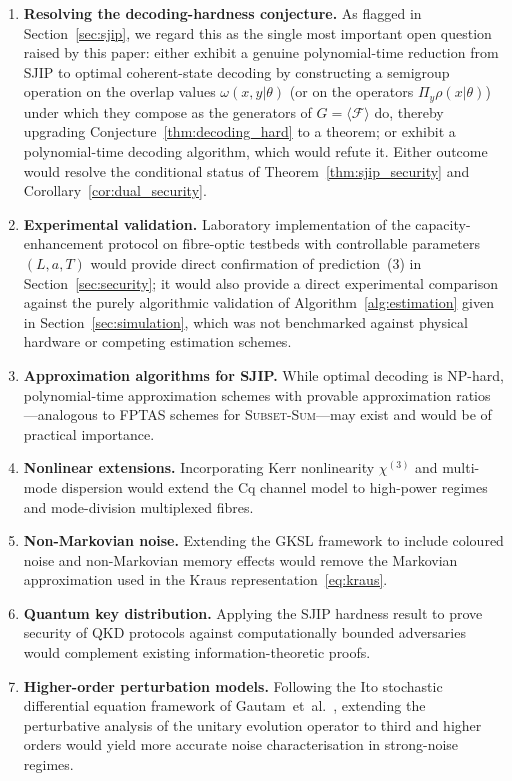 \documentclass[journal,twocolumn]{IEEEtran}
\theoremstyle{definition}
\theoremstyle{plain}
\begin{document}
\begin{enumerate}[leftmargin=*, label=(\arabic*), itemsep=2pt]
  \item \textbf{Resolving the decoding-hardness conjecture.}  As
    flagged in Section~\ref{sec:sjip}, we regard this as the single
    most important open question raised by this paper: either
    exhibit a genuine polynomial-time reduction from SJIP to optimal
    coherent-state decoding by constructing a semigroup operation on
    the overlap values $\omega(x,y|\theta)$ (or on the operators
    $\Pi_y\rho(x|\theta)$) under which they compose as the generators
    of $G=\langle\mathcal F\rangle$ do, thereby upgrading
    Conjecture~\ref{thm:decoding_hard} to a theorem; or exhibit a
    polynomial-time decoding algorithm, which would refute it.
    Either outcome would resolve the conditional status of
    Theorem~\ref{thm:sjip_security} and
    Corollary~\ref{cor:dual_security}.

  \item \textbf{Experimental validation.}  Laboratory implementation
    of the capacity-enhancement protocol on fibre-optic testbeds
    with controllable parameters $(L, a, T)$ would provide direct
    confirmation of prediction~(3) in Section~\ref{sec:security}; it
    would also provide a direct experimental comparison against the
    purely algorithmic validation of Algorithm~\ref{alg:estimation}
    given in Section~\ref{sec:simulation}, which was not benchmarked
    against physical hardware or competing estimation schemes.

  \item \textbf{Approximation algorithms for SJIP.}  While optimal
    decoding is NP-hard, polynomial-time approximation schemes with
    provable approximation ratios---analogous to FPTAS schemes for
    \textsc{Subset-Sum}---may exist and would be of practical
    importance.

  \item \textbf{Nonlinear extensions.}  Incorporating Kerr
    nonlinearity $\chi^{(3)}$ and multi-mode dispersion would
    extend the Cq channel model to high-power regimes and
    mode-division multiplexed fibres.

  \item \textbf{Non-Markovian noise.}  Extending the GKSL framework
    to include coloured noise and non-Markovian memory effects would
    remove the Markovian approximation used in the Kraus
    representation~\eqref{eq:kraus}.

  \item \textbf{Quantum key distribution.}  Applying the
    SJIP hardness result to prove security of QKD protocols against
    computationally bounded adversaries would complement existing
    information-theoretic proofs.

  \item \textbf{Higher-order perturbation models.}  Following
    the Ito stochastic differential equation framework of
    Gautam~et~al.~\cite{gautam2015a}, extending the perturbative
    analysis of the unitary evolution operator to third and higher
    orders would yield more accurate noise characterisation in
    strong-noise regimes.
\end{enumerate}
\end{document}
